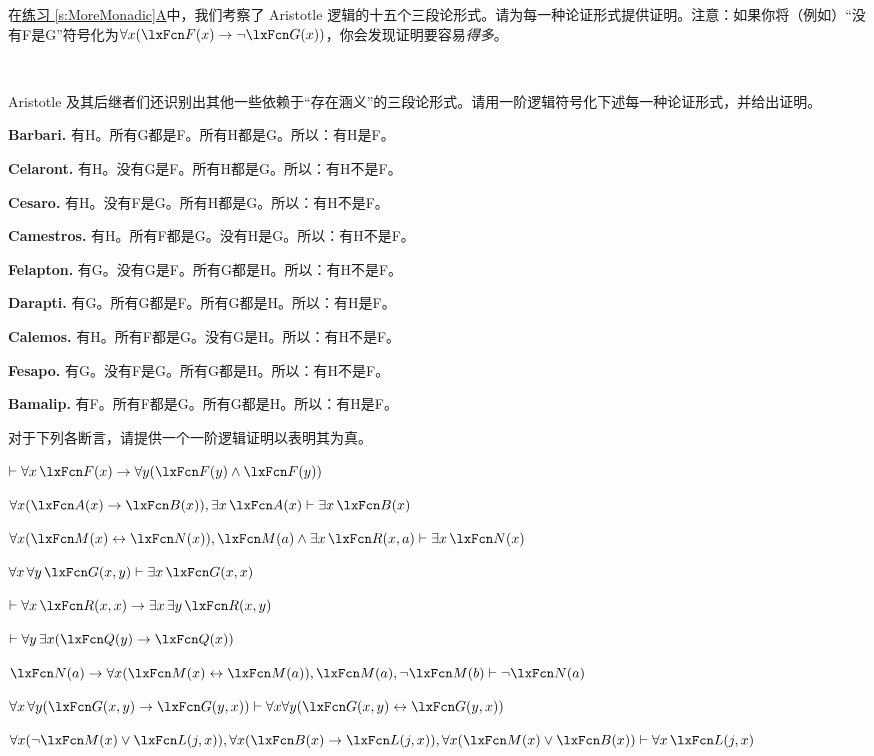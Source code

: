 \problempart
\label{pr.BarbaraEtc.proof1}
在\hyperref[pr.BarbaraEtc]{练习 \ref*{s:MoreMonadic}A}中，我们考察了 Aristotle 逻辑的十五个三段论形式。请为每一种论证形式提供证明。注意：如果你将（例如）“没有F是G”符号化为$\forall x (\atom{F}{x} \eif \enot \atom{G}{x})$，你会发现证明要容易\emph{得多}。

\

\problempart
\label{pr.BarbaraEtc.proof2}
Aristotle 及其后继者们还识别出其他一些依赖于“存在涵义”的三段论形式。请用一阶逻辑符号化下述每一种论证形式，并给出证明。


\begin{compactlist}
	\item \textbf{Barbari.} 有H。所有G都是F。所有H都是G。所以：有H是F。
	\item \textbf{Celaront.} 有H。没有G是F。所有H都是G。所以：有H不是F。
	\item \textbf{Cesaro.} 有H。没有F是G。所有H都是G。所以：有H不是F。
	\item \textbf{Camestros.} 有H。所有F都是G。没有H是G。所以：有H不是F。
	\item \textbf{Felapton.} 有G。没有G是F。所有G都是H。所以：有H不是F。
	\item \textbf{Darapti.} 有G。所有G都是F。所有G都是H。所以：有H是F。
	\item \textbf{Calemos.} 有H。所有F都是G。没有G是H。所以：有H不是F。
	\item \textbf{Fesapo.} 有G。没有F是G。所有G都是H。所以：有H不是F。
	\item \textbf{Bamalip.} 有F。所有F都是G。所有G都是H。所以：有H是F。
\end{compactlist}

\problempart
\label{pr.someFOLproofs}
对于下列各断言，请提供一个一阶逻辑证明以表明其为真。


\begin{compactlist}
\item $\proves \forall x\,\atom{F}{x} \eif \forall y(\atom{F}{y} \eand \atom{F}{y})$
\item $\forall x(\atom{A}{x}\eif \atom{B}{x}), \exists x\,\atom{A}{x} \proves \exists x\,\atom{B}{x}$
\item $\forall x(\atom{M}{x} \eiff \atom{N}{x}), \atom{M}{a} \eand \exists x\,\atom{R}{x,a} \proves \exists x\,\atom{N}{x}$
\item $\forall x\, \forall y\,\atom{G}{x,y}\proves\exists x\,\atom{G}{x,x}$
\item $\proves\forall x\,\atom{R}{x,x} \eif \exists x\, \exists y\,\atom{R}{x,y}$
\item $\proves\forall y\, \exists x (\atom{Q}{y} \eif \atom{Q}{x})$
\item $\atom{N}{a} \eif \forall x(\atom{M}{x} \eiff \atom{M}{a}), \atom{M}{a}, \enot\atom{M}{b}\proves \enot \atom{N}{a}$
\item $\forall x\, \forall y (\atom{G}{x,y} \eif \atom{G}{y,x}) \proves \forall x\forall y (\atom{G}{x,y} \eiff \atom{G}{y,x})$
\item $\forall x(\enot\atom{M}{x} \eor \atom{L}{j,x}), \forall x(\atom{B}{x}\eif \atom{L}{j,x}), \forall x(\atom{M}{x}\eor \atom{B}{x})\proves \forall x\,\atom{L}{j,x}$
\end{compactlist}

